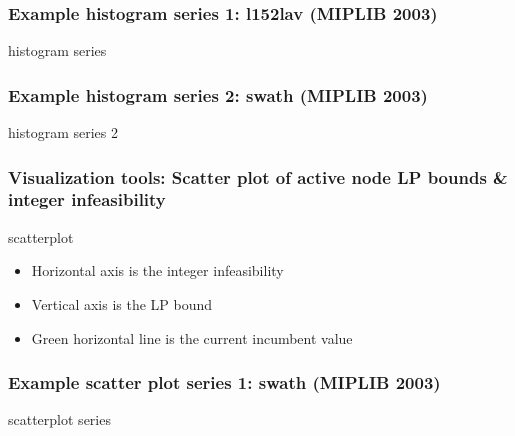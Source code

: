 \documentclass{beamer}
\begin{document}
\begin{frame}
\frametitle{Example histogram series 1: l152lav (MIPLIB 2003)}

\begin{center}
histogram series
\end{center}
\end{frame}

\begin{frame}
\frametitle{Example histogram series 2: swath (MIPLIB 2003)}

\begin{center}
histogram series 2
\end{center}
\end{frame}

\begin{frame}
\frametitle{Visualization tools: Scatter plot of active node LP bounds \& integer infeasibility}

\begin{center}
scatterplot
\end{center}

\begin{itemize}
\item Horizontal axis is the integer infeasibility
\item Vertical axis is the LP bound
\item Green horizontal line is the current incumbent value
\end{itemize}
\end{frame}

\begin{frame}
\frametitle{Example scatter plot series 1: swath (MIPLIB 2003)}

\begin{center}
scatterplot series
\end{center}
\end{frame}
\end{document}
